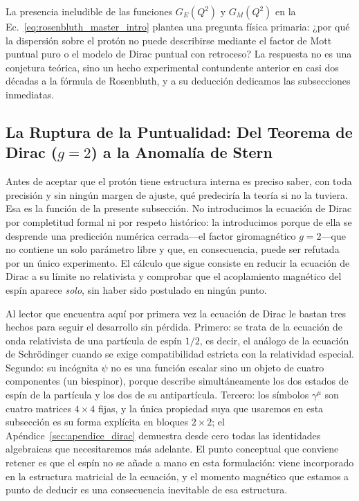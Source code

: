 \documentclass[10pt,a4paper]{article}
\begin{document}
La presencia ineludible de las funciones $G_E(Q^2)$ y $G_M(Q^2)$ en la Ec.~\eqref{eq:rosenbluth_master_intro} plantea una pregunta física primaria: ¿por qué la dispersión sobre el protón no puede describirse mediante el factor de Mott puntual puro o el modelo de Dirac puntual con retroceso? La respuesta no es una conjetura teórica, sino un hecho experimental contundente anterior en casi dos décadas a la fórmula de Rosenbluth, y a su deducción dedicamos las subsecciones inmediatas.

\subsection{La Ruptura de la Puntualidad: Del Teorema de Dirac (\texorpdfstring{$g=2$}{g=2}) a la Anomalía de Stern}
Antes de aceptar que el protón tiene estructura interna es preciso saber, con toda precisión y sin ningún margen de ajuste, qué predeciría la teoría si no la tuviera. Esa es la función de la presente subsección. No introducimos la ecuación de Dirac por completitud formal ni por respeto histórico: la introducimos porque de ella se desprende una predicción numérica cerrada---el factor giromagnético $g = 2$---que no contiene un solo parámetro libre y que, en consecuencia, puede ser refutada por un único experimento. El cálculo que sigue consiste en reducir la ecuación de Dirac a su límite no relativista y comprobar que el acoplamiento magnético del espín aparece \emph{solo}, sin haber sido postulado en ningún punto.

Al lector que encuentra aquí por primera vez la ecuación de Dirac le bastan tres hechos para seguir el desarrollo sin pérdida. Primero: se trata de la ecuación de onda relativista de una partícula de espín $1/2$, es decir, el análogo de la ecuación de Schrödinger cuando se exige compatibilidad estricta con la relatividad especial. Segundo: su incógnita $\psi$ no es una función escalar sino un objeto de cuatro componentes (un biespinor), porque describe simultáneamente los dos estados de espín de la partícula y los dos de su antipartícula. Tercero: los símbolos $\gamma^\mu$ son cuatro matrices $4\times 4$ fijas, y la única propiedad suya que usaremos en esta subsección es su forma explícita en bloques $2\times 2$; el Apéndice~\ref{sec:apendice_dirac} demuestra desde cero todas las identidades algebraicas que necesitaremos más adelante. El punto conceptual que conviene retener es que el espín no se añade a mano en esta formulación: viene incorporado en la estructura matricial de la ecuación, y el momento magnético que estamos a punto de deducir es una consecuencia inevitable de esa estructura.
\end{document}
